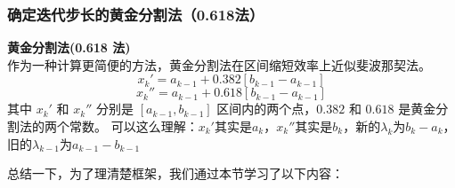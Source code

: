 \subsubsection{确定迭代步长的黄金分割法（0.618法）}
\label{确定迭代步长的黄金分割法}
\begin{notebox}{\textbf{黄金分割法(0.618 法)}}{}
    \\作为一种计算更简便的方法，黄金分割法在区间缩短效率上近似斐波那契法。
    \[
    x_k' = a_{k-1} + 0.382 [b_{k-1} - a_{k-1}]
    \]
    \[
    x_k'' = a_{k-1} + 0.618 [b_{k-1} - a_{k-1}]
    \]
    其中 $x_k'$ 和 $x_k''$ 分别是 $[a_{k-1}, b_{k-1}]$ 区间内的两个点，$0.382$ 和 $0.618$ 是黄金分割法的两个常数。
    可以这么理解：$x_k'$其实是$a_k$，$x_k''$其实是$b_k$，新的$\lambda_k$为$b_{k}-a_{k}$，旧的$\lambda_{k-1}$为$a_{k-1}-b_{k-1}$ 
\end{notebox}
总结一下，为了理清楚框架，我们通过本节学习了以下内容：

